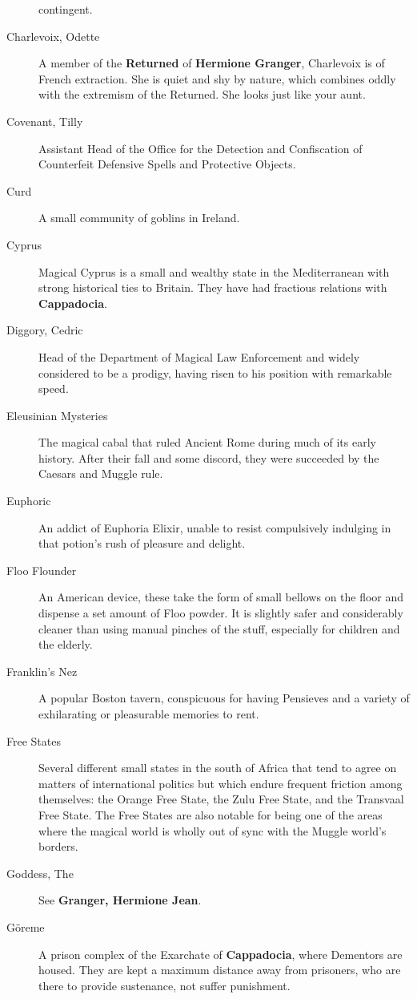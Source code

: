 \begin{description}
contingent.
\item[Charlevoix, Odette]
A member of the \textbf{Returned }of \textbf{Hermione Granger},
Charlevoix is of French extraction. She is quiet and shy by nature,
which combines oddly with the extremism of the Returned. She looks just
like your aunt.
\item[Covenant, Tilly]
Assistant Head of the Office for the Detection and Confiscation of
Counterfeit Defensive Spells and Protective Objects.
\item[Curd]
A small community of goblins in Ireland.
\item[Cyprus]
Magical Cyprus is a small and wealthy state in the Mediterranean with
strong historical ties to Britain. They have had fractious relations
with \textbf{Cappadocia}.
\item[Diggory, Cedric]
Head of the Department of Magical Law Enforcement and widely considered
to be a prodigy, having risen to his position with remarkable speed.
\item[Eleusinian Mysteries]
The magical cabal that ruled Ancient Rome during much of its early
history. After their fall and some discord, they were succeeded by the
Caesars and Muggle rule.
\item[Euphoric]
An addict of Euphoria Elixir, unable to resist compulsively indulging in
that potion's rush of pleasure and delight.
\item[Floo Flounder]
An American device, these take the form of small bellows on the floor
and dispense a set amount of Floo powder. It is slightly safer and
considerably cleaner than using manual pinches of the stuff, especially
for children and the elderly.
\item[Franklin's Nez]
A popular Boston tavern, conspicuous for having Pensieves and a variety
of exhilarating or pleasurable memories to rent.
\item[Free States]
Several different small states in the south of Africa that tend to agree
on matters of international politics but which endure frequent friction
among themselves: the Orange Free State, the Zulu Free State, and the
Transvaal Free State. The Free States are also notable for being one of
the areas where the magical world is wholly out of sync with the Muggle
world's borders.
\item[Goddess, The]
See \textbf{Granger, Hermione Jean}.
\item[Göreme]
A prison complex of the Exarchate of \textbf{Cappadocia}, where
Dementors are housed. They are kept a maximum distance away from
prisoners, who are there to provide sustenance, not suffer punishment.

\end{description}
